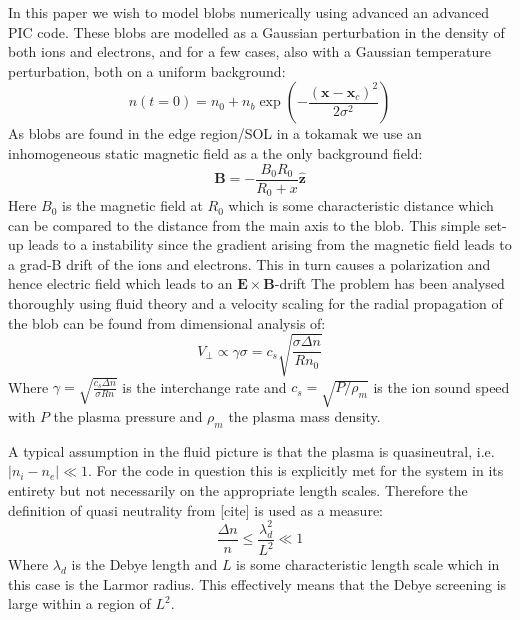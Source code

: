 \documentclass[9pt,twocolumn]{article}
\newcommand{\fd}[1]{\mathbf{#1}}
\renewcommand{\=}[1]{\stackrel{#1}{=}} %
\theoremstyle{definition}
\theoremstyle{remark}
\begin{document}
In this paper we wish to model blobs numerically using advanced an advanced PIC code. These blobs are modelled as a Gaussian perturbation in the density of both ions and electrons, and for a few cases, also with a Gaussian temperature perturbation, both on a uniform background:
\begin{equation}
n(t=0) = n_0+ n_b\exp\left(-\frac{(\fd x-\fd x_c)^2}{2\sigma^2}\right)
\end{equation}
As blobs are found in the edge region/SOL in a tokamak we use an inhomogeneous static magnetic field as a the only background field:
\begin{equation}
\fd B = -\frac{B_0R_0}{R_0+x}{\fd {\hat{z}}}
\end{equation}
Here $B_0$ is the magnetic field at $R_0$ which is some characteristic distance which can be compared to the distance from the main axis to the blob.
This simple set-up leads to a instability since the gradient arising from the magnetic field leads to a grad-B drift of the ions and electrons. This in turn causes a polarization and hence electric field which leads to an $\fd {E\times B}$-drift 
The problem has been analysed thoroughly using fluid theory and a velocity scaling for the radial propagation of the blob can be found from dimensional analysis of:
\begin{equation}
V_{\perp} \propto \gamma\sigma = c_s\sqrt{\frac{\sigma\Delta n}{R n_0}}
\end{equation}
Where $\gamma=\sqrt{\frac{c_s\Delta n}{\sigma R n}}$ is the interchange rate and $c_s=\sqrt{P/\rho_m}$ is the ion sound speed with $P$ the plasma pressure and $\rho_m$ the plasma mass density.

A typical assumption in the fluid picture is that the plasma is quasineutral, i.e. $|n_i-n_e|\ll 1$. For the code in question this is explicitly met for the system in its entirety but not necessarily on the appropriate length scales. Therefore the definition of quasi neutrality from [cite] is used as a measure:
\begin{equation}
\frac{\Delta n}{n}\leqslant \frac{\lambda_d^2}{L^2}\ll 1
\end{equation}
Where $\lambda_d$ is the Debye length and $L$ is some characteristic length scale which in this case is the Larmor radius. This effectively means that the Debye screening is large within a region of $L^2$. 
\end{document}
